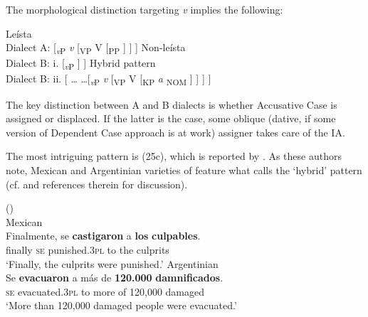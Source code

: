 \documentclass[output=paper]{langsci/langscibook}
\begin{document}
The morphological distinction targeting \textit{v} implies the following:

\ea%
    \label{ex:gallego:25}
    \ea Leísta \\
     Dialect A:   [\textit{\textsubscript{v}}\textsubscript{P} \textit{v} [\textsubscript{VP} V  [\textsubscript{PP}  ] ] ] 
    \ex Non-leísta \\
    Dialect B:  i.  [\textit{\textsubscript{v}}\textsubscript{P} \relax [\textsubscript{VP} V [\textsubscript{KP} \textit{a} \ConnectHead{DP}\textsubscript{ACC} ] ] ]
    \ex Hybrid pattern\\
    Dialect B:  ii.   [ \ldots\xspace {} \ldots\xspace [\textit{\textsubscript{v}}\textsubscript{P} \textit{v} [\textsubscript{VP} V [\textsubscript{KP} \textit{a} \textsubscript{NOM} ] ] ] ]
    \z
\z\largerpage



The key distinction between A and B dialects is whether Accusative Case is assigned or displaced. If the latter is the case, some oblique (dative, if some version of  Dependent Case approach is at work) assigner takes care of the IA.

The most intriguing pattern is (25c), which is reported by \citet{Ordóñez2007}. As these authors note, Mexican and Argentinian varieties of  feature what \citet{RAE-ASALE2009} calls the ‘hybrid’ pattern (cf. \citealt{Planells2017} and references therein for discussion).

\ea%
    (\citealt[12]{Ordóñez2007})\\
    \ea Mexican \label{ex:gallego:26}\\
    \gll Finalmente, se  \textbf{castigaron}       a  \textbf{los} \textbf{culpables}.        \\
         finally         \textsc{se}   punished.\textsc{3pl}   to the culprits\\
    \glt ‘Finally, the culprits were punished.’
    \ex Argentinian \\
    \gll Se  \textbf{evacuaron}    a más de \textbf{120.000} \textbf{damnificados}.              \\
         \textsc{se}   evacuated.\textsc{3pl} to more of 120,000 damaged\\
    \glt  ‘More than 120,000 damaged people were evacuated.’
    \z
\z
\end{document}
